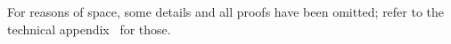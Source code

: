 \documentclass[compsoc,conference,letterpaper,fleqn]{IEEEtran}
\begin{document}
For reasons of space, some details and all proofs have been omitted;
refer to the technical appendix~\citep{technical_appendix} for those.





\end{document}
